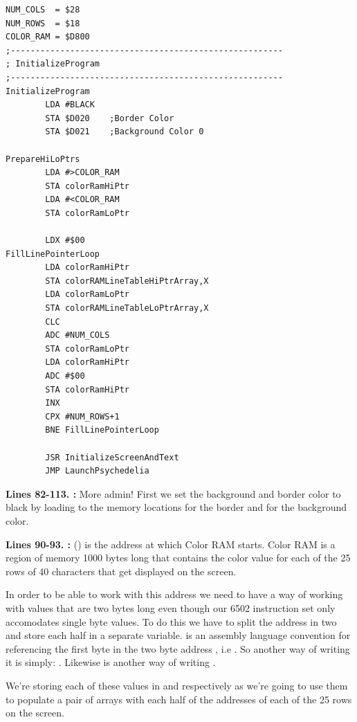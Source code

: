 \clearpage
\begin{lstlisting}[caption=The initialization routine - visited only once\, at the very start of execution]
NUM_COLS  = $28
NUM_ROWS  = $18
COLOR_RAM = $D800
;-------------------------------------------------------
; InitializeProgram
;-------------------------------------------------------
InitializeProgram   
        LDA #BLACK
        STA $D020    ;Border Color
        STA $D021    ;Background Color 0

PrepareHiLoPtrs
        LDA #>COLOR_RAM
        STA colorRamHiPtr
        LDA #<COLOR_RAM
        STA colorRamLoPtr

        LDX #$00
FillLinePointerLoop
        LDA colorRamHiPtr
        STA colorRAMLineTableHiPtrArray,X
        LDA colorRamLoPtr
        STA colorRAMLineTableLoPtrArray,X
        CLC 
        ADC #NUM_COLS
        STA colorRamLoPtr
        LDA colorRamHiPtr
        ADC #$00
        STA colorRamHiPtr
        INX 
        CPX #NUM_ROWS+1
        BNE FillLinePointerLoop

        JSR InitializeScreenAndText
        JMP LaunchPsychedelia

\end{lstlisting}
\clearpage

\textbf{Lines 82-113. :} More admin!  First we set the background and border color to black by loading
 to the memory locations  for the border and  for the background color.

\bigskip
\bigskip
\textbf{Lines 90-93. :}  () is the address at which Color RAM starts. Color
RAM is a region of memory 1000 bytes long that contains the color value for each of the 25 rows of 40 characters that get displayed on the
screen. 

In order to be able to work with this address we need to have a way of working with values that are two bytes long even though
our 6502 instruction set only accomodates single byte values. To do this we have to split the address in two and store each half in 
a separate variable.  is an assembly language convention for referencing the first byte in the two byte address
, i.e . So another way of writing it is simply: . Likewise  is
another way of writing . 

We're storing each of these values in  and  respectively
as we're going to use them to populate a pair of arrays with each half of the addresses of each of the 25 rows on the screen.


